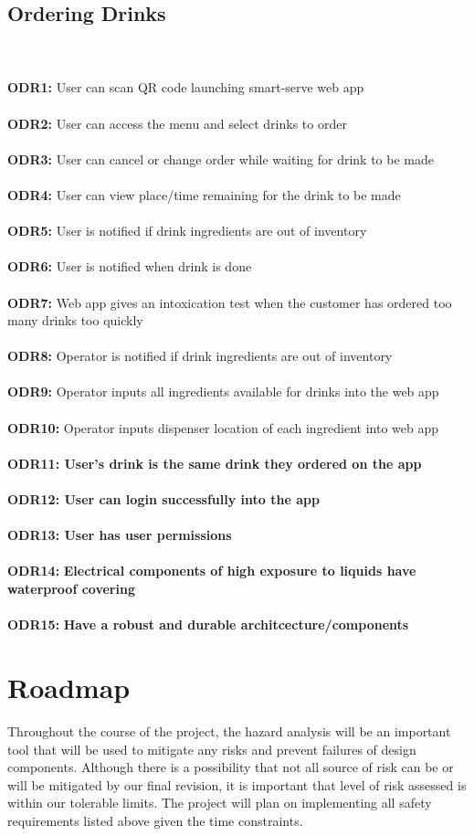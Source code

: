 \documentclass{article}
\begin{document}
    \subsection{Ordering Drinks} 
    \\\\
    \noindent\textbf{ODR1:} User can scan QR code launching smart-serve web app \\\\ 
    \textbf{ODR2:} User can access the menu and select drinks to order\\\\ 
    \textbf{ODR3:} User can cancel or change order while waiting for drink to be made \\\\ 
    \textbf{ODR4:} User can view place/time remaining for the drink to be made \\\\ 
    \textbf{ODR5:} User is notified if drink ingredients are out of inventory\\\\ 
    \textbf{ODR6:} User is notified when drink is done\\\\
    \textbf{ODR7:} Web app gives an intoxication test when the customer has ordered too many drinks too quickly\\\\
    \textbf{ODR8:} Operator is notified if drink ingredients are out of inventory\\\\
    \textbf{ODR9:} Operator inputs all ingredients available for drinks into the web app\\\\
    \textbf{ODR10:} Operator inputs dispenser location of each ingredient into web app\\\\
    \textbf{\textbf{ODR11:} User's drink is the same drink they ordered on the app \\\\
    \textbf{ODR12:} User can login successfully into the app 
    \\\\
    \textbf{ODR13:} User has user permissions } \\\\
    \textbf{ODR14:} \textbf{Electrical components of high exposure to liquids have waterproof covering}\\\\
    \textbf{ODR15:} \textbf{Have a robust and durable architcecture/components}
    
    
\section{Roadmap}
    Throughout the course of the project, the hazard analysis will be an important tool that will be used to mitigate any risks and prevent failures of design components. Although there is a possibility that not all source of risk can be or will be mitigated by our final revision, it is important that level of risk assessed is within our tolerable limits. The project will plan on implementing all safety requirements listed above given the time constraints. 
    
\end{document}
